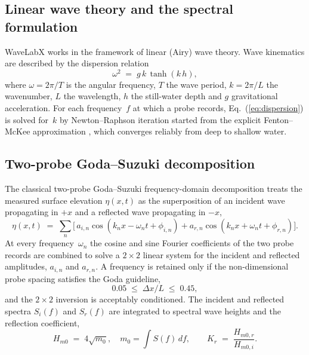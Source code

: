 \documentclass[preprint,12pt,a4paper]{elsarticle}
\begin{document}
\subsection{Linear wave theory and the spectral formulation}
WaveLabX works in the framework of linear (Airy) wave theory. Wave
kinematics are described by the dispersion relation
\begin{equation}
\omega^2 \;=\; g\,k\,\tanh(k\,h),
\label{eq:dispersion}
\end{equation}
where $\omega = 2\pi/T$ is the angular frequency, $T$ the wave period,
$k = 2\pi/L$ the wavenumber, $L$ the wavelength, $h$ the still-water
depth and $g$ gravitational acceleration. For each frequency~$f$ at
which a probe records, Eq.~(\ref{eq:dispersion}) is solved for~$k$ by
Newton--Raphson iteration started from the explicit Fenton--McKee
approximation \citep{fenton1990lengths}, which converges reliably from
deep to shallow water.

\subsection{Two-probe Goda--Suzuki decomposition}
The classical two-probe Goda--Suzuki frequency-domain decomposition
\citep{goda1976incident} treats the measured surface elevation
$\eta(x,t)$ as the superposition of an incident wave propagating in
$+x$ and a reflected wave propagating in $-x$,
\begin{equation}
\eta(x,t) \;=\; \sum_n \big[\,a_{i,n}\cos(k_n x - \omega_n t + \phi_{i,n})
                          + a_{r,n}\cos(k_n x + \omega_n t + \phi_{r,n})\big].
\label{eq:superposition}
\end{equation}
At every frequency~$\omega_n$ the cosine and sine Fourier coefficients
of the two probe records are combined to solve a $2\times 2$ linear
system for the incident and reflected amplitudes, $a_{i,n}$ and
$a_{r,n}$. A frequency is retained only if the non-dimensional probe
spacing satisfies the Goda guideline,
\begin{equation}
0.05 \;\le\; \Delta x / L \;\le\; 0.45,
\label{eq:goda}
\end{equation}
and the $2\times 2$ inversion is acceptably conditioned. The incident
and reflected spectra $S_i(f)$ and $S_r(f)$ are integrated to spectral
wave heights and the reflection coefficient,
\begin{equation}
H_{m0} \;=\; 4\sqrt{m_0}, \quad
m_0 = \int S(f)\,df, \qquad
K_r \;=\; \frac{H_{m0,r}}{H_{m0,i}}.
\label{eq:hm0}
\end{equation}
\end{document}
